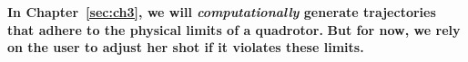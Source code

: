 \begin{tcolorbox}[before skip=20pt, after skip=20pt, sharp corners]
\begin{center}
\textbf{In Chapter~\ref{sec:ch3}, we will \emph{computationally} generate trajectories that adhere to the physical limits of a quadrotor.}
\textbf{But for now, we rely on the user to adjust her shot if it violates these limits.}
\end{center}
\end{tcolorbox}

